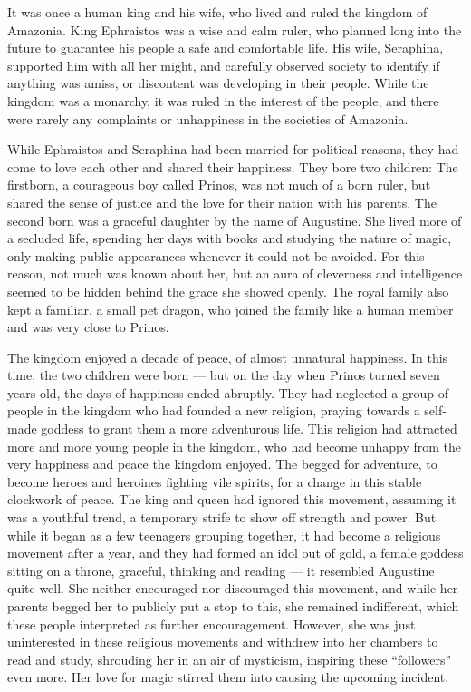 It was once a human king and his wife, who lived and ruled the kingdom of Amazonia. King Ephraistos was a wise and calm ruler, who planned long into the future to guarantee his people a safe and comfortable life. His wife, Seraphina, supported him with all her might, and carefully observed society to identify if anything was amiss, or discontent was developing in their people. While the kingdom was a monarchy, it was ruled in the interest of the people, and there were rarely any complaints or unhappiness in the societies of Amazonia.

While Ephraistos and Seraphina had been married for political reasons, they had come to love each other and shared their happiness. They bore two children: The firstborn, a courageous boy called Prinos, was not much of a born ruler, but shared the sense of justice and the love for their nation with his parents. The second born was a graceful daughter by the name of Augustine. She lived more of a secluded life, spending her days with books and studying the nature of magic, only making public appearances whenever it could not be avoided. For this reason, not much was known about her, but an aura of cleverness and intelligence seemed to be hidden behind the grace she showed openly. The royal family also kept a familiar, a small pet dragon, who joined the family like a human member and was very close to Prinos.

The kingdom enjoyed a decade of peace, of almost unnatural happiness. In this time, the two children were born --- but on the day when Prinos turned seven years old, the days of happiness ended abruptly. They had neglected a group of people in the kingdom who had founded a new religion, praying towards a self-made goddess to grant them a more adventurous life. This religion had attracted more and more young people in the kingdom, who had become unhappy from the very happiness and peace the kingdom enjoyed. The begged for adventure, to become heroes and heroines fighting vile spirits, for a change in this stable clockwork of peace. The king and queen had ignored this movement, assuming it was a youthful trend, a temporary strife to show off strength and power. But while it began as a few teenagers grouping together, it had become a religious movement after a year, and they had formed an idol out of gold, a female goddess sitting on a throne, graceful, thinking and reading --- it resembled Augustine quite well. She neither encouraged nor discouraged this movement, and while her parents begged her to publicly put a stop to this, she remained indifferent, which these people interpreted as further encouragement. However, she was just uninterested in these religious movements and withdrew into her chambers to read and study, shrouding her in an air of mysticism, inspiring these \enquote{followers} even more. Her love for magic stirred them into causing the upcoming incident.

